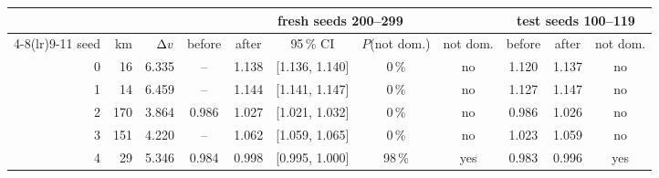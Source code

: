 \begin{tabular}{rrrccccc@{\hspace{1.2em}}ccc}
\toprule
 & & & \multicolumn{5}{c}{fresh seeds 200--299} & \multicolumn{3}{c}{test seeds 100--119} \\
\cmidrule(lr){4-8}\cmidrule(lr){9-11}
seed & km & $\Delta v$ & before & after & 95\,\% CI & $P$(not dom.) & not dom. & before & after & not dom. \\
\midrule
0 & 16 & 6.335 & -- & 1.138 & [1.136, 1.140] & 0\,\% & no & 1.120 & 1.137 & no \\
1 & 14 & 6.459 & -- & 1.144 & [1.141, 1.147] & 0\,\% & no & 1.127 & 1.147 & no \\
2 & 170 & 3.864 & 0.986 & 1.027 & [1.021, 1.032] & 0\,\% & no & 0.986 & 1.026 & no \\
3 & 151 & 4.220 & -- & 1.062 & [1.059, 1.065] & 0\,\% & no & 1.023 & 1.059 & no \\
4 & 29 & 5.346 & 0.984 & 0.998 & [0.995, 1.000] & 98\,\% & yes & 0.983 & 0.996 & yes \\
\bottomrule
\end{tabular}
